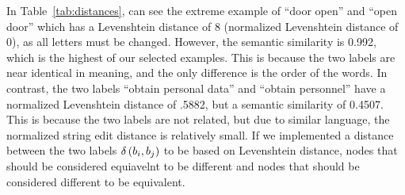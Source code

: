 In Table~\ref{tab:distances}, can see the extreme example of ``door open'' and ``open door'' which has a Levenshtein distance of 8 (normalized Levenshtein distance of 0), as all letters must be changed. However, the semantic similarity is 0.992, which is the highest of our selected examples. This is because the two labels are near identical in meaning, and the only difference is the order of the words. In contrast, the two labels ``obtain personal data'' and ``obtain personnel'' have a normalized Levenshtein distance of .5882, but a semantic similarity of 0.4507. This is because the two labels are not related, but due to similar language, the normalized string edit distance is relatively small. If we implemented a distance between the two labels
$\delta\left(\ATlabel{d}{i}, \ATlabel{e}{j}\right)$ %
to be based on Levenshtein distance, nodes that should be considered equiavelnt to be different and nodes that should be considered different to be equivalent.

